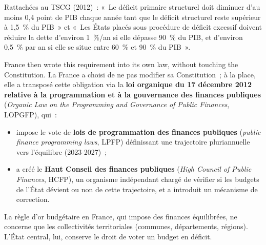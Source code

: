 \begin{remark}
  Rattachées au TSCG (2012)~: «~Le déficit primaire structurel doit diminuer
  d'au moins 0,4 point de PIB chaque année tant que le déficit structurel reste
  supérieur à 1,5~\% du PIB~» et «~Les États placés sous procédure de déficit
  excessif doivent réduire la dette d'environ 1~\%/an si elle dépasse 90~\% du
  PIB, et d'environ 0,5~\% par an si elle se situe entre 60~\% et 90~\% du
  PIB~».
\end{remark}

France then wrote this requirement into its own law, without touching the
Constitution. La France a choisi de ne pas modifier sa Constitution~; à la
place, elle a transposé cette obligation via la \textbf{loi organique du 17
décembre 2012 relative à la programmation et à la gouvernance des finances
publiques} (\textit{Organic Law on the Programming and Governance of
Public Finances}, LOPGFP), qui~:
\begin{itemize}
  \item impose le vote de \textbf{lois de programmation des finances publiques}
    (\textit{public finance programming laws}, LPFP) définissant une
    trajectoire pluriannuelle vers l'équilibre (2023-2027)~;
  \item a créé le \textbf{Haut Conseil des finances publiques}
    (\textit{High Council of Public Finances}, HCFP), un organisme indépendant chargé
    de vérifier si les budgets de l'État dévient ou non de cette trajectoire, et
    a introduit un mécanisme de correction.
\end{itemize}
La règle d'or budgétaire en France, qui impose des finances équilibrées, ne
concerne que les collectivités territoriales (communes, départements, régions).
L'État central, lui, conserve le droit de voter un budget en déficit.


